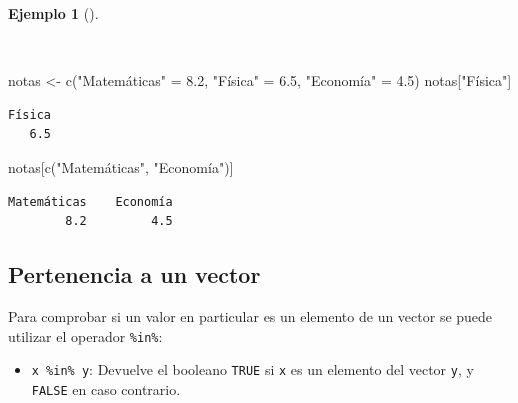 \documentclass[
  spanish,
  a4paper,
]{scrreport}
\newenvironment{Shaded}{\begin{snugshade}}{\end{snugshade}}
\newcommand{\FloatTok}[1]{\textcolor[rgb]{0.68,0.00,0.00}{#1}}
\newcommand{\FunctionTok}[1]{\textcolor[rgb]{0.28,0.35,0.67}{#1}}
\newcommand{\NormalTok}[1]{\textcolor[rgb]{0.00,0.23,0.31}{#1}}
\newcommand{\OtherTok}[1]{\textcolor[rgb]{0.00,0.23,0.31}{#1}}
\newcommand{\StringTok}[1]{\textcolor[rgb]{0.13,0.47,0.30}{#1}}
\providecommand{\tightlist}{%
  \setlength{\itemsep}{0pt}\setlength{\parskip}{0pt}}
\theoremstyle{definition}
\theoremstyle{definition}
\newtheorem{example}{Ejemplo}[chapter]
\theoremstyle{remark}
\begin{document}
\begin{example}[]\protect\hypertarget{exm-acceso-vector-nombres}{}\label{exm-acceso-vector-nombres}

~

\begin{Shaded}
\begin{Highlighting}[]
\NormalTok{notas }\OtherTok{\textless{}{-}} \FunctionTok{c}\NormalTok{(}\StringTok{"Matemáticas"} \OtherTok{=} \FloatTok{8.2}\NormalTok{, }\StringTok{"Física"} \OtherTok{=} \FloatTok{6.5}\NormalTok{, }\StringTok{"Economía"} \OtherTok{=} \FloatTok{4.5}\NormalTok{)}
\NormalTok{notas[}\StringTok{"Física"}\NormalTok{]}
\end{Highlighting}
\end{Shaded}

\begin{verbatim}
Física 
   6.5 
\end{verbatim}

\begin{Shaded}
\begin{Highlighting}[]
\NormalTok{notas[}\FunctionTok{c}\NormalTok{(}\StringTok{"Matemáticas"}\NormalTok{, }\StringTok{"Economía"}\NormalTok{)]}
\end{Highlighting}
\end{Shaded}

\begin{verbatim}
Matemáticas    Economía 
        8.2         4.5 
\end{verbatim}

\end{example}

\subsection{Pertenencia a un vector}\label{pertenencia-a-un-vector}

Para comprobar si un valor en particular es un elemento de un vector se
puede utilizar el operador \texttt{\%in\%}:

\begin{itemize}
\tightlist
\item
  \texttt{x\ \%in\%\ y}: Devuelve el booleano \texttt{TRUE} si
  \texttt{x} es un elemento del vector \texttt{y}, y \texttt{FALSE} en
  caso contrario.
\end{itemize}
\end{document}
